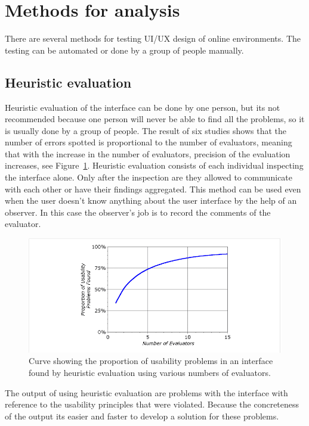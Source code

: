 \documentclass[10pt,english,a4paper]{article}
\begin{document}
\section{Methods for analysis}\label{methods}
There are several methods for testing UI/UX design of online environments. The testing 
can be automated or done by a group of people manually.

\subsection{Heuristic evaluation}
Heuristic evaluation of the interface can be done by one person, but
its not recommended because one person will never be able to
find all the problems, so it is usually done by a group of people\cite{a2020_heuristic}. 
The result of six studies shows that the number of errors spotted is proportional to the number of evaluators,
meaning that with the increase in the number of evaluators, precision of the evaluation increases, see Figure~\ref{fig:increase}.
Heuristic evaluation consists of each individual inspecting the interface alone. Only after the
inspection are they allowed to communicate with each other or have their findings aggregated\cite{a2020_heuristic}.
This method can be used even when the user doesn't know anything about the user interface by
the help of an observer. In this case the observer's job is to record the comments of the evaluator\cite{a2020_heuristic}.

\begin{figure}[h]
    \includegraphics[width=1\textwidth]{images/heuristic-results.png}
    \caption{Curve showing the proportion of usability problems in an interface
     found by heuristic evaluation using various numbers of evaluators\cite{a2020_heuristic}.}
     \label{fig:increase}
\end{figure}
The output of using heuristic evaluation are problems with the interface with reference to the usability
principles that were violated\cite{a2020_heuristic}. Because the concreteness of the output 
its easier and faster to develop a solution for these problems. 
\end{document}

